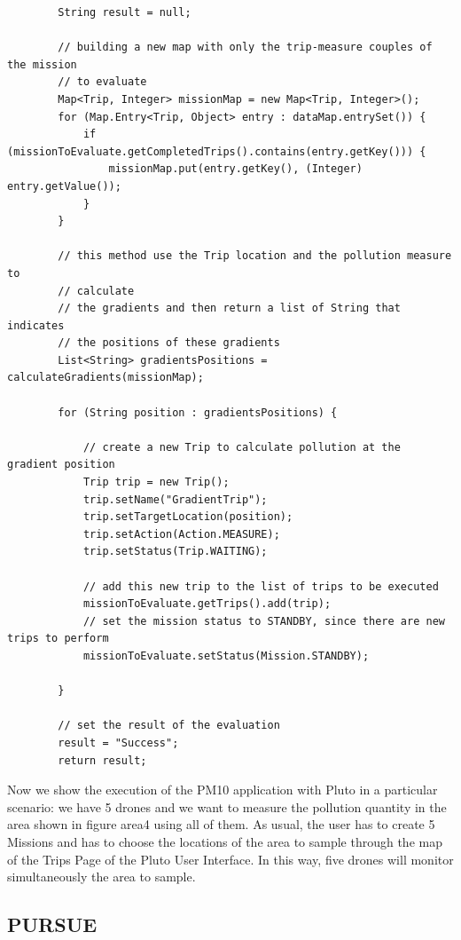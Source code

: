 \begin{lstlisting}
		String result = null;

		// building a new map with only the trip-measure couples of the mission
		// to evaluate
		Map<Trip, Integer> missionMap = new Map<Trip, Integer>();
		for (Map.Entry<Trip, Object> entry : dataMap.entrySet()) {
			if (missionToEvaluate.getCompletedTrips().contains(entry.getKey())) {
				missionMap.put(entry.getKey(), (Integer) entry.getValue());
			}
		}

		// this method use the Trip location and the pollution measure to
		// calculate
		// the gradients and then return a list of String that indicates
		// the positions of these gradients
		List<String> gradientsPositions = calculateGradients(missionMap);

		for (String position : gradientsPositions) {

			// create a new Trip to calculate pollution at the gradient position
			Trip trip = new Trip();
			trip.setName("GradientTrip");
			trip.setTargetLocation(position);
			trip.setAction(Action.MEASURE);
			trip.setStatus(Trip.WAITING);

			// add this new trip to the list of trips to be executed
			missionToEvaluate.getTrips().add(trip);
			// set the mission status to STANDBY, since there are new trips to perform
			missionToEvaluate.setStatus(Mission.STANDBY);
			
		}
			
		// set the result of the evaluation
		result = "Success";
		return result;
\end{lstlisting}


Now we show the execution of the PM10 application with Pluto in a particular scenario:
we have 5 drones and we want to measure the pollution quantity in the area shown in figure area4 using all of them.
As usual, the user has to create 5 Missions and has to choose the locations of the area to sample through the map of the Trips Page of the Pluto User Interface.
In this way, five drones will monitor simultaneously the area to sample.




\subsection{PURSUE}


